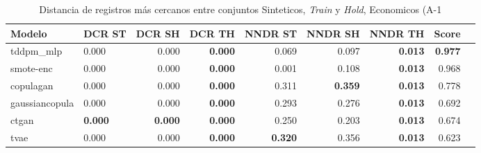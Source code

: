\begin{table}[H]
\centering
\caption{Distancia de registros más cercanos entre conjuntos Sinteticos, \emph{Train} y \emph{Hold}, Economicos (A-1}
\label{table-dcr-economicos-a-1}
\begin{tabular}{|l|l|r|r|r|r|r|r|r|}
\hline
\rowcolor[gray]{0.8}
Modelo & DCR ST & DCR SH & DCR TH & NNDR ST & NNDR SH & NNDR TH & \textbf{Score} \\
\hline tddpm\_mlp & 0.000 & \cellcolor[rgb]{0.9, 0.54, 0.52} 0.000 & \bfseries 0.000 & 0.069 & 0.097 & \bfseries 0.013 & \bfseries 0.977 \\
\hline smote-enc & \cellcolor[rgb]{0.9, 0.54, 0.52} 0.000 & 0.000 & \bfseries 0.000 & 0.001 & 0.108 & \bfseries 0.013 & 0.968 \\
\hline copulagan & 0.000 & 0.000 & \bfseries 0.000 & 0.311 & \bfseries 0.359 & \bfseries 0.013 & 0.778 \\
\hline gaussiancopula & 0.000 & 0.000 & \bfseries 0.000 & 0.293 & 0.276 & \bfseries 0.013 & 0.692 \\
\hline ctgan & \bfseries 0.000 & \bfseries 0.000 & \bfseries 0.000 & 0.250 & 0.203 & \bfseries 0.013 & 0.674 \\
\hline tvae & 0.000 & 0.000 & \bfseries 0.000 & \bfseries 0.320 & 0.356 & \bfseries 0.013 & 0.623 \\
\hline
\end{tabular}
\end{table}
